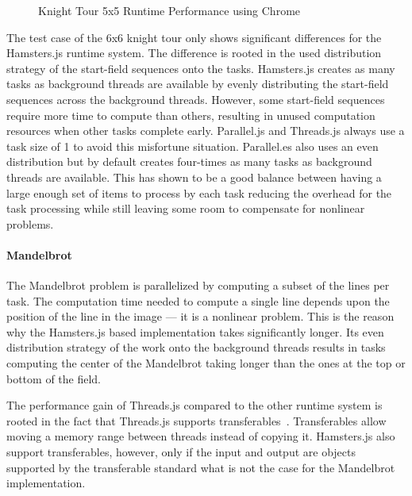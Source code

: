 \begin{figure}
	\centering
	
	\caption{Knight Tour 5x5 Runtime Performance using Chrome}
	\label{fig:runtime-performance-chrome}
\end{figure}

The test case of the 6x6 knight tour only shows significant differences for the Hamsters.js runtime system. The difference is rooted in the used distribution strategy of the start-field sequences onto the tasks. Hamsters.js creates as many tasks as background threads are available by evenly distributing the start-field sequences across the background threads. However, some start-field sequences require more time to compute than others, resulting in unused computation resources when other tasks complete early. Parallel.js and Threads.js always use a task size of 1 to avoid this misfortune situation. Parallel.es also uses an even distribution but by default creates four-times as many tasks as background threads are available. This has shown to be a good balance between having a large enough set of items to process by each task reducing the overhead for the task processing while still leaving some room to compensate for nonlinear problems. 

\paragraph{Mandelbrot}
The Mandelbrot problem is parallelized by computing a subset of the lines per task. The computation time needed to compute a single line depends upon the position of the line in the image --- it is a nonlinear problem. This is the reason why the Hamsters.js based implementation takes significantly longer. Its even distribution strategy of the work onto the background threads results in tasks computing the center of the Mandelbrot taking longer than the ones at the top or bottom of the field. 

The performance gain of Threads.js compared to the other runtime system is rooted in the fact that Threads.js supports transferables~\cite[Section 2.7.4]{w3cHtml5}. Transferables allow moving a memory range between threads instead of copying it. Hamsters.js also support transferables, however, only if the input and output are objects supported by the transferable standard what is not the case for the Mandelbrot implementation.

